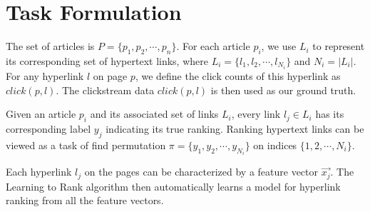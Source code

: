 \section {Task Formulation}

The set of articles is $P = \{p_1, p_2, \cdots, p_n\}$. For each article $p_i$, we use $L_i$ to represent its corresponding set of hypertext links, where $L_i = \{l_1, l_2, \cdots, l_{N_i}\}$ and $N_i = |L_i|$.  For any hyperlink $l$ on page $p$, we define the click counts of this hyperlink as $click(p, l)$. The clickstream data $click(p, l)$ is then used as our ground truth.

Given an article $p_i$ and its associated set of links $L_i$, every link $l_j \in L_i$ has its corresponding label $y_j$ indicating its true ranking. Ranking hypertext links can be viewed as a task of find permutation $\pi = \{y_1, y_2, \cdots, y_{N_i}\}$ on indices $\{1,2,\cdots,N_i\}$. 

Each hyperlink $l_j$ on the pages can be characterized by a feature vector $\vec{x_j}$. The Learning to Rank algorithm then automatically learns a model for hyperlink ranking from all the feature vectors.